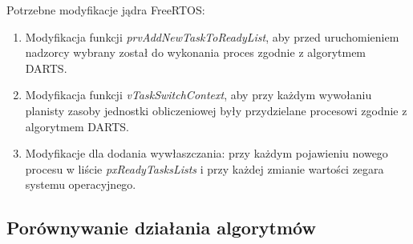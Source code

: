 \documentclass[../../main]{subfiles}
\begin{document}
Potrzebne modyfikacje jądra FreeRTOS:

\begin{enumerate}
    \item Modyfikacja funkcji \textit{prvAddNewTaskToReadyList}, aby przed uruchomieniem nadzorcy wybrany został do wykonania proces zgodnie z algorytmem DARTS.
    \item Modyfikacja funkcji \textit{vTaskSwitchContext}, aby przy każdym wywołaniu planisty zasoby jednostki obliczeniowej były przydzielane procesowi zgodnie z algorytmem DARTS.
    \item Modyfikacje dla dodania wywłaszczania: przy każdym pojawieniu nowego procesu w liście \textit{pxReadyTasksLists} i przy każdej zmianie wartości zegara systemu operacyjnego.
\end{enumerate}

\subsection{Porównywanie działania algorytmów}
\end{document}
